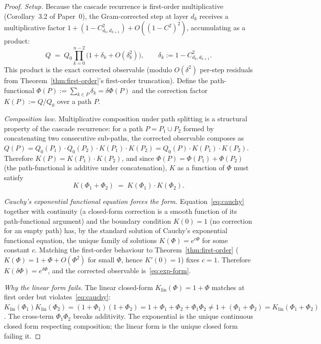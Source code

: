 \documentclass[12pt,a4paper]{article}
\theoremstyle{remark}
\begin{document}
\begin{proof}
\emph{Setup.} Because the cascade recurrence is first-order
multiplicative (Corollary~3.2 of Paper~0), the Gram-corrected step at
layer $d_k$ receives a multiplicative factor
$1 + (1 - C_{d_k,d_{k+1}}^2) + O((1-C^2)^2)$, accumulating as a product:
\[
Q \;=\; Q_0\prod_{k=0}^{n-2}\bigl(1 + \delta_k + O(\delta_k^2)\bigr),
\qquad \delta_k := 1 - C_{d_k,d_{k+1}}^2.
\]
This product is the exact corrected observable (modulo $O(\delta^2)$
per-step residuals from Theorem~\ref{thm:first-order}'s first-order
truncation). Define the path-functional
$\Phi(P) := \sum_{k\in P} \delta_k = \delta\Phi(P)$ and the correction factor
$K(P) := Q/Q_0$ over a path $P$.

\emph{Composition law.} Multiplicative composition under path
splitting is a structural property of the cascade recurrence: for a
path $P = P_1 \cup P_2$ formed by concatenating two consecutive
sub-paths, the corrected observable composes as
$Q(P) = Q_0(P_1)\cdot Q_0(P_2) \cdot K(P_1) \cdot K(P_2) = Q_0(P)\cdot K(P_1)\cdot K(P_2)$.
Therefore $K(P) = K(P_1)\cdot K(P_2)$, and since $\Phi(P) = \Phi(P_1) + \Phi(P_2)$
(the path-functional is additive under concatenation), $K$ as a
function of $\Phi$ must satisfy
\begin{equation}\label{eq:cauchy}
K(\Phi_1 + \Phi_2) \;=\; K(\Phi_1) \cdot K(\Phi_2).
\end{equation}

\emph{Cauchy's exponential functional equation forces the form.}
Equation~\eqref{eq:cauchy} together with continuity (a closed-form
correction is a smooth function of its path-functional argument) and
the boundary condition $K(0) = 1$ (no correction for an empty path)
has, by the standard solution of Cauchy's exponential functional
equation, the unique family of solutions $K(\Phi) = e^{c\Phi}$ for
some constant $c$. Matching the first-order behaviour to
Theorem~\ref{thm:first-order} ($K(\Phi) = 1 + \Phi + O(\Phi^2)$ for
small $\Phi$, hence $K'(0) = 1$) fixes $c = 1$. Therefore
$K(\delta\Phi) = e^{\delta\Phi}$, and the corrected observable is~\eqref{eq:exp-form}.

\emph{Why the linear form fails.} The linear closed-form
$K_{\mathrm{lin}}(\Phi) = 1 + \Phi$ matches at first order but
violates~\eqref{eq:cauchy}: $K_{\mathrm{lin}}(\Phi_1) K_{\mathrm{lin}}(\Phi_2)
= (1 + \Phi_1)(1 + \Phi_2) = 1 + \Phi_1 + \Phi_2 + \Phi_1\Phi_2 \neq
1 + (\Phi_1 + \Phi_2) = K_{\mathrm{lin}}(\Phi_1 + \Phi_2)$. The cross-term
$\Phi_1\Phi_2$ breaks additivity. The exponential is the unique
continuous closed form respecting composition; the linear form is the
unique closed form failing it.


\end{proof}
\end{document}
